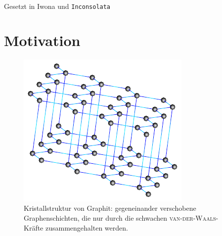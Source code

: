 \documentclass[a4paper, 10pt, twoside, openany]{book} %
\makeatletter
\def \mainmatter {\clearpage \@mainmattertrue \pagenumbering{arabic}}
\makeatother
\begin{document}
\vfill

\begin{flushright}
    \footnotesize
    Gesetzt in Iwona und \texttt{Inconsolata}
\end{flushright}

\restoregeometry

\mainmatter

\chapter{Motivation}

\begin{figure}[t]
    \begin{minipage}[b]{0.46\textwidth}
        \includegraphics[width=\textwidth]{Abbildungen/Raumstrukturen/Graphit.pdf}
        \caption[Kristallstruktur von Graphit]{Kristallstruktur von Graphit: gegeneinander verschobene Graphenschichten, die nur durch die schwachen \textsc{van-der-Waals}-Kräfte zusammengehalten werden. \cite{Rozplocha}}
        \label{Graphit}
    \end{minipage}
    \hfill
    \begin{minipage}[b]{0.5\textwidth}

\end{minipage}
\end{figure}
\end{document}
